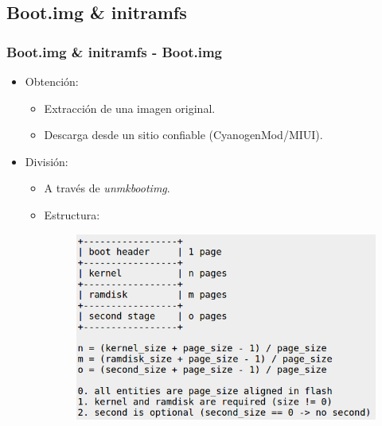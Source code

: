 \subsection{Boot.img \& initramfs}
\begin{frame}
  \frametitle{Boot.img \& initramfs - Boot.img}
  \begin{itemize}
      \item Obtención:
      \begin{itemize}      
	  \item Extracción de una imagen original.
	  
	  \item Descarga desde un sitio confiable (CyanogenMod/MIUI).
      \end{itemize}      
      
      \item División:
      \begin{itemize}
	  \item A través de \textit{unmkbootimg}.
      
	  \item Estructura:
	  \begin{figure}
	    \includegraphics[scale=0.3]{images/boot-image-structure.png}
	  \end{figure}
      \end{itemize}
  \end{itemize}
\end{frame}

